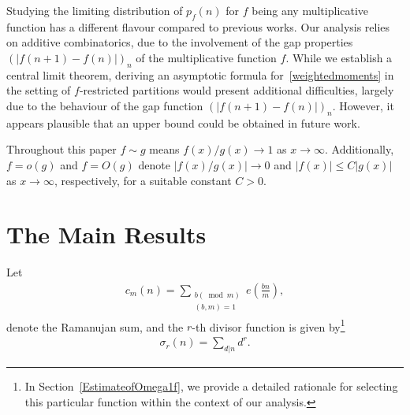 \documentclass[12pt, oneside,reqno]{amsart}
\numberwithin{equation}{section}
\newtheorem{theorem}{Theorem}[section]
\begin{document}
\medskip

Studying the limiting distribution of $p_f(n)$ for $f$ being any multiplicative function has a different flavour compared to previous works. Our analysis relies on additive combinatorics, due to the involvement of the gap properties $(|f(n+1)-f(n)|)_{n}$ of the multiplicative function $f$. While we establish a central limit theorem, deriving an asymptotic formula for~\eqref{weightedmoments} in the setting of $f$-restricted partitions would present additional difficulties, largely due to the behaviour of the gap function $(|f(n+1)-f(n)|)_{n}$. However, it appears plausible that an upper bound could be obtained in future work.


\medskip

Throughout this paper $f\sim g$ means ${f(x)}/{g(x)}\to 1$ as $x\to\infty$. Additionally, $f=o(g)$ and $f=O(g)$ denote $\left|{f(x)}/{g(x)}\right|\to 0$ and $|f(x)|\leq C|g(x)|$ as $x\to\infty$, respectively, for a suitable constant $C>0$. 


\section{The Main Results}\label{mainresults}

Let 
\begin{align}\label{ramanujansum} 
c_m(n) 
=\sum_{\substack{b(\bmod{m})\\(b,m)=1}} e\left(\frac{bn}{m}\right), 
\end{align}
denote the Ramanujan sum, and the $r$-th divisor function is given by\footnote{In Section~\ref{EstimateofOmega1f}, we provide a detailed rationale for selecting this particular function within the context of our analysis.}
\begin{align*} 
\sigma_r(n) 
=\sum_{d|n}d^r. 
\end{align*}

\end{document}
